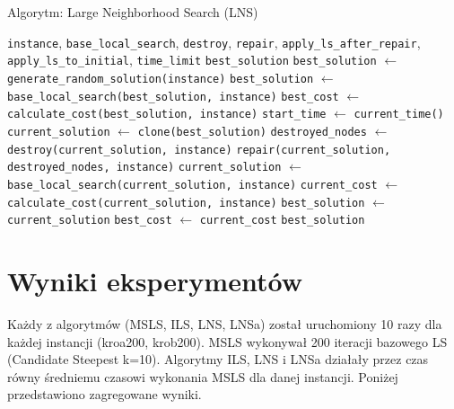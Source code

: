 \documentclass[12pt,a4paper]{article}
\begin{document}
\begin{algorithm}[H]
\caption{Algorytm: Large Neighborhood Search (LNS)}
\label{alg:lns}
\begin{algorithmic}[1]
\Require \texttt{instance}, \texttt{base\_local\_search}, \texttt{destroy}, \texttt{repair}, \texttt{apply\_ls\_after\_repair}, \texttt{apply\_ls\_to\_initial}, \texttt{time\_limit}
\Ensure \texttt{best\_solution}
\State \texttt{best\_solution} $\leftarrow$ \texttt{generate\_random\_solution(instance)}
    \State \texttt{best\_solution} $\leftarrow$ \texttt{base\_local\_search(best\_solution, instance)}
\EndIf
\State \texttt{best\_cost} $\leftarrow$ \texttt{calculate\_cost(best\_solution, instance)}
\State \texttt{start\_time} $\leftarrow$ \texttt{current\_time()}
    \State \texttt{current\_solution} $\leftarrow$ \texttt{clone(best\_solution)}
    \State \texttt{destroyed\_nodes} $\leftarrow$ \texttt{destroy(current\_solution, instance)}
    \State \texttt{repair(current\_solution, destroyed\_nodes, instance)} 
        \State \texttt{current\_solution} $\leftarrow$ \texttt{base\_local\_search(current\_solution, instance)}
    \EndIf
    \State \texttt{current\_cost} $\leftarrow$ \texttt{calculate\_cost(current\_solution, instance)}
        \State \texttt{best\_solution} $\leftarrow$ \texttt{current\_solution}
        \State \texttt{best\_cost} $\leftarrow$ \texttt{current\_cost}
    \EndIf
\EndWhile
\State \Return \texttt{best\_solution}
\end{algorithmic}
\end{algorithm}

\section{Wyniki eksperymentów}
Każdy z algorytmów (MSLS, ILS, LNS, LNSa) został uruchomiony 10 razy dla każdej instancji (kroa200, krob200). MSLS wykonywał 200 iteracji bazowego LS (Candidate Steepest k=10). Algorytmy ILS, LNS i LNSa działały przez czas równy średniemu czasowi wykonania MSLS dla danej instancji. Poniżej przedstawiono zagregowane wyniki.
\end{document}
